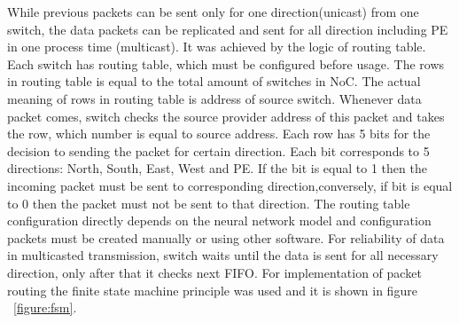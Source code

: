 While previous packets can be sent only for one direction(unicast) from one switch, the data packets can be replicated and sent for all direction including PE in one process time (multicast). It was achieved by the logic of routing table. Each switch has routing table, which must be configured before usage. The rows in routing table is equal to the total amount of switches in NoC. The actual meaning of rows in routing table is address of source switch. Whenever data packet comes, switch checks the source provider address of this packet and takes the row, which number is equal to source address. Each row has 5 bits for the decision to sending the packet for certain direction.  Each bit corresponds to 5 directions: North, South, East, West and PE. If the bit is equal to 1 then the incoming packet must be sent to corresponding direction,conversely, if bit is equal to 0 then the packet must not be sent to that direction. The routing table configuration directly depends on the neural network model and configuration packets must be created manually or using other software. For reliability of data in multicasted transmission, switch waits until the data is sent for all necessary direction, only after that it checks next FIFO. For implementation of packet routing the finite state machine principle was used and it is shown in figure ~\ref{figure:fsm}.


